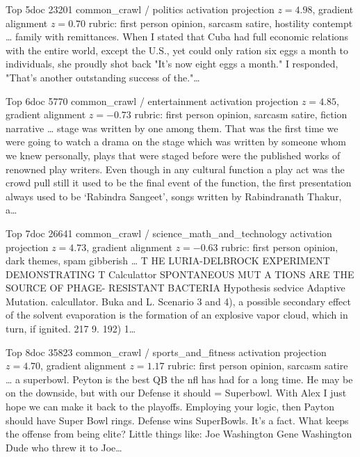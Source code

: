 \begin{docbox}{Top 5}{doc 23201 \textbullet{} common\_crawl / politics \textbullet{} activation projection $z=4.98$, gradient alignment $z=0.70$ \textbullet{} rubric: first person opinion, sarcasm satire, hostility contempt}
\ldots{} family with remittances. When I stated that Cuba had full economic relations with the entire world, except the U.S., yet could only ration six eggs a month to individuals, she proudly shot back "It's now eight eggs a month." I responded, "That's another outstanding success of the."\ldots{}
\end{docbox}

\begin{docbox}{Top 6}{doc 5770 \textbullet{} common\_crawl / entertainment \textbullet{} activation projection $z=4.85$, gradient alignment $z=-0.73$ \textbullet{} rubric: first person opinion, sarcasm satire, fiction narrative}
\ldots{} stage was written by one among them. That was the first time we were going to watch a drama on the stage which was written by someone whom we knew personally, plays that were staged before were the published works of renowned play writers.  Even though in any cultural function a play act was the crowd pull still it used to be the final event of the function, the first presentation always used to be ‘Rabindra Sangeet’, songs written by Rabindranath Thakur, a\ldots{}
\end{docbox}

\begin{docbox}{Top 7}{doc 26641 \textbullet{} common\_crawl / science\_math\_and\_technology \textbullet{} activation projection $z=4.73$, gradient alignment $z=-0.63$ \textbullet{} rubric: first person opinion, dark themes, spam gibberish}
\ldots{} T HE LURIA-DELBROCK EXPERIMENT DEMONSTRATING T Calculattor SPONTANEOUS MUT A TIONS ARE THE SOURCE OF PHAGE- RESISTANT BACTERIA Hypothesis sedvice Adaptive Mutation.  calcullator. Buka and L. Scenario 3 and 4), a possible secondary effect of the solvent evaporation is the formation of an explosive vapor cloud, which in turn, if ignited.  217 9. 192) 1\ldots{}
\end{docbox}

\begin{docbox}{Top 8}{doc 35823 \textbullet{} common\_crawl / sports\_and\_fitness \textbullet{} activation projection $z=4.70$, gradient alignment $z=1.17$ \textbullet{} rubric: first person opinion, sarcasm satire}
\ldots{} a superbowl. Peyton is the best QB the nfl has had for a long time. He may be on the downside, but with our Defense it should = Superbowl. With Alex I just hope we can make it back to the playoffs.  Employing your logic, then Payton should have Super Bowl rings. Defense wins SuperBowls. It's a fact. What keeps the offense from being elite?  Little things like:  Joe Washington Gene Washington Dude who threw it to Joe\ldots{}
\end{docbox}

